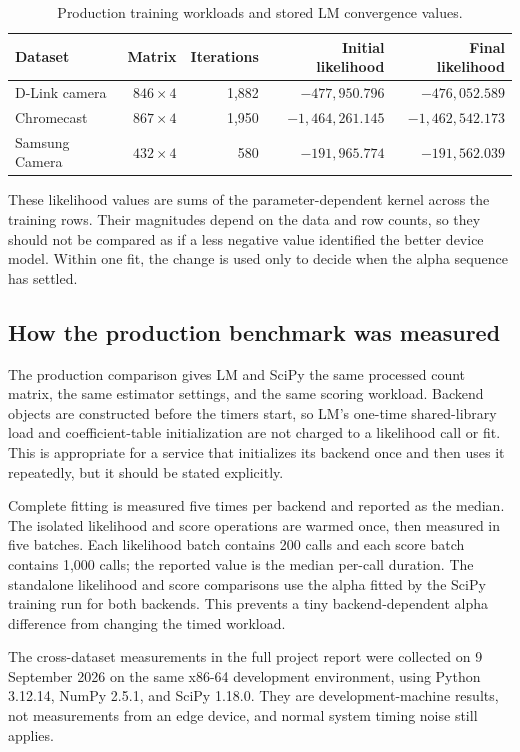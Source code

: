 \documentclass[11pt]{article}
\begin{document}
\begin{table}[htbp]
\centering
\small
\caption{Production training workloads and stored LM convergence values.}
\label{tab:fit-workloads}
\begin{tabular}{lrrrr}
\toprule
Dataset & Matrix & Iterations & Initial likelihood & Final likelihood \\
\midrule
D-Link camera & \(846\times4\) & 1,882 & $-477{,}950.796$ & $-476{,}052.589$ \\
Chromecast & \(867\times4\) & 1,950 & $-1{,}464{,}261.145$ & $-1{,}462{,}542.173$ \\
Samsung Camera & \(432\times4\) & 580 & $-191{,}965.774$ & $-191{,}562.039$ \\
\bottomrule
\end{tabular}
\end{table}

These likelihood values are sums of the parameter-dependent kernel across the
training rows. Their magnitudes depend on the data and row counts, so they
should not be compared as if a less negative value identified the better
device model. Within one fit, the change is used only to decide when the alpha
sequence has settled.

\subsection{How the production benchmark was measured}

The production comparison gives LM and SciPy the same processed count matrix,
the same estimator settings, and the same scoring workload. Backend objects are
constructed before the timers start, so LM's one-time shared-library load and
coefficient-table initialization are not charged to a likelihood call or fit.
This is appropriate for a service that initializes its backend once and then
uses it repeatedly, but it should be stated explicitly.

Complete fitting is measured five times per backend and reported as the median.
The isolated likelihood and score operations are warmed once, then measured in
five batches. Each likelihood batch contains 200 calls and each score batch
contains 1,000 calls; the reported value is the median per-call duration. The
standalone likelihood and score comparisons use the alpha fitted by the SciPy
training run for both backends. This prevents a tiny backend-dependent alpha
difference from changing the timed workload.

The cross-dataset measurements in the full project report were collected on
9 September 2026 on the same x86-64 development environment, using Python
3.12.14, NumPy 2.5.1, and SciPy 1.18.0. They are development-machine results,
not measurements from an edge device, and normal system timing noise still
applies.
\end{document}
